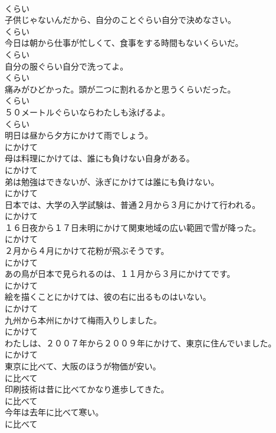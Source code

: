 \documentclass[8pt]{extreport}
\begin{document}
\begin{CJK}{UTF8}{min}
\\	くらい
\\	子供じゃないんだから、自分のことぐらい自分で決めなさい。	
\\	くらい
\\	今日は朝から仕事が忙しくて、食事をする時間もないくらいだ。	
\\	くらい
\\	自分の服ぐらい自分で洗ってよ。	
\\	くらい
\\	痛みがひどかった。頭が二つに割れるかと思うくらいだった。	
\\	くらい
\\	５０メートルぐらいならわたしも泳げるよ。	
\\	くらい
\\	明日は昼から夕方にかけて雨でしょう。	
\\	にかけて
\\	母は料理にかけては、誰にも負けない自身がある。	
\\	にかけて
\\	弟は勉強はできないが、泳ぎにかけては誰にも負けない。	
\\	にかけて
\\	日本では、大学の入学試験は、普通２月から３月にかけて行われる。	
\\	にかけて
\\	１６日夜から１７日未明にかけて関東地域の広い範囲で雪が降った。	
\\	にかけて
\\	２月から４月にかけて花粉が飛ぶそうです。	
\\	にかけて
\\	あの鳥が日本で見られるのは、１１月から３月にかけてです。	
\\	にかけて
\\	絵を描くことにかけては、彼の右に出るものはいない。	
\\	にかけて
\\	九州から本州にかけて梅雨入りしました。	
\\	にかけて
\\	わたしは、２００７年から２００９年にかけて、東京に住んでいました。	
\\	にかけて
\\	東京に比べて、大阪のほうが物価が安い。	
\\	に比べて
\\	印刷技術は昔に比べてかなり進歩してきた。	
\\	に比べて
\\	今年は去年に比べて寒い。	
\\	に比べて

\end{CJK}
\end{document}
